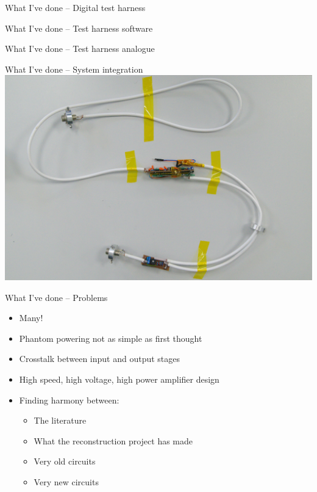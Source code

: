 \documentclass[aspectratio=169,11pt, xcolor={table}]{beamer}
\begin{document}
\begin{frame}{What I've done -- Digital test harness}

\end{frame}


\begin{frame}{What I've done -- Test harness software}

\end{frame}

\begin{frame}{What I've done -- Test harness analogue}

\end{frame}

\begin{frame}{What I've done -- System integration}
	\centering
	\includegraphics[height=0.8\textheight]{figs/integrated}
\end{frame}

\begin{frame}{What I've done -- Problems}
	\begin{itemize}
		\item \alert{Many!}
		\item Phantom powering not as simple as first thought
		\item Crosstalk between input and output stages
		\item High speed, high voltage, high power amplifier design
		\item Finding harmony between:
		\begin{itemize}
			\item The literature
			\item What the reconstruction project has made
			\item Very old circuits
			\item Very new circuits
		\end{itemize}
	\end{itemize}
\end{frame}
\end{document}
